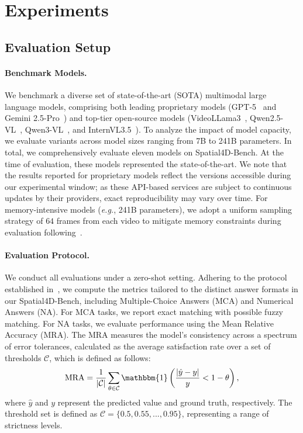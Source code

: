 \documentclass{article}
\newcommand{\eg}{\textit{e.g.}}
\begin{document}


\section{Experiments}
\label{experiments}


\subsection{Evaluation Setup}
\label{sec:evaluation_setup}

\paragraph{Benchmark Models.}
We benchmark a diverse set of state-of-the-art (SOTA) multimodal large language models, comprising both leading proprietary models (GPT-5~\cite{OpenAI2025} and Gemini 2.5-Pro~\cite{Gemini2025}) and top-tier open-source models (VideoLLama3~\cite{zhang2025videollama}, Qwen2.5-VL~\cite{bai2025qwen2}, Qwen3-VL~\cite{bai2025qwen2}, and InternVL3.5~\cite{wang2025internvl3}).
To analyze the impact of model capacity, we evaluate variants across model sizes ranging from 7B to 241B parameters.
In total, we comprehensively evaluate eleven models on Spatial4D-Bench.
At the time of evaluation, these models represented the state-of-the-art.
We note that the results reported for proprietary models reflect the versions accessible during our experimental window; as these API-based services are subject to continuous updates by their providers, exact reproducibility may vary over time.
For memory-intensive models (\eg, 241B parameters), we adopt a uniform sampling strategy of $64$ frames from each video to mitigate memory constraints during evaluation following~\cite{Yang_2025_CVPR}.



\paragraph{Evaluation Protocol.}
We conduct all evaluations under a zero-shot setting.
Adhering to the protocol established in~\cite{Yang_2025_CVPR}, we compute the metrics tailored to the distinct answer formats in our Spatial4D-Bench, including Multiple-Choice Answers (MCA) and Numerical Answers (NA).
For MCA tasks, we report  exact matching with possible fuzzy matching.
For NA tasks, we evaluate performance using the Mean Relative Accuracy (MRA).
The MRA measures the model's consistency across a spectrum of error tolerances, calculated as the average satisfaction rate over a set of thresholds $\mathcal{C}$, which is defined as follows:
\begin{equation}
    \mathrm{MRA} = \frac{1}{|\mathcal{C}|}\sum_{\theta \in \mathcal{C} }\mathbbm{1} \left( \frac{\left | \hat{y} - y \right | }{y} < 1 - \theta \right), 
\end{equation}
where $\hat{y}$ and $y$ represent the predicted value and ground truth, respectively.
The threshold set is defined as $\mathcal{C} = \{0.5, 0.55, ... ,0.95\}$, representing a range of strictness levels.
\end{document}
